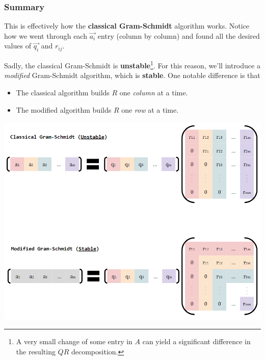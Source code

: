 \documentclass[letterpaper]{article}
\newcommand{\0}{\mathbf{0}}
\begin{document}
\subsubsection{Summary}
This is effectively how the \textbf{classical Gram-Schmidt} algorithm works. Notice how we went through each $\vec{a_i}$ entry (column by column) and found all the desired values of $\vec{q_i}$ and $r_{ij}$. 

\bigskip 

Sadly, the classical Gram-Schmidt is \textbf{unstable}\footnote{A very small change of some entry in $A$ can yield a significant difference in the resulting $QR$ decomposition.}. For this reason, we'll introduce a \emph{modified} Gram-Schmidt algorithm, which is \textbf{stable}. One notable difference is that 
\begin{itemize}
    \item The classical algorithm builds $R$ one \emph{column} at a time. 
    \item The modified algorithm builds $R$ one \emph{row} at a time.
\end{itemize}
\begin{center}
    \includegraphics[scale=0.75]{assets/gram.png}
\end{center}
\end{document}
